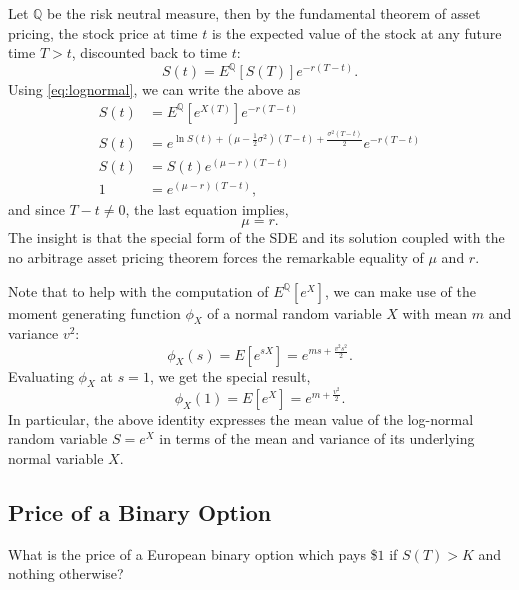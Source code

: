 \documentclass{amsart}
\theoremstyle{plain}
\numberwithin{equation}{section}
\begin{document}
Let $\mathbb{Q}$ be the risk neutral measure, then 
by the fundamental theorem of asset pricing, the stock 
price at time $t$ is the expected value of the stock at any future
time $T>t$, discounted back to time $t$: 
\begin{equation*}
S(t) = E^{\mathbb{Q}}[S(T)]e^{-r(T-t)}.
\end{equation*}
Using \ref{eq:lognormal}, we can write the above as
\begin{align*}
S(t) &= E^{\mathbb{Q}}[e^{X(T)}]e^{-r(T-t)}\\
S(t) &= e^{\ln S(t) + \left(\mu - \frac{1}{2}\sigma^2\right) (T-t) + \frac{\sigma^{2}(T-t)}{2}}
e^{-r(T-t)}\\
S(t) &= S(t) e^{(\mu-r)(T-t)}\\
1 &= e^{(\mu-r)(T-t)},
\end{align*}
and since $T-t \neq 0$, the last equation implies,
\begin{equation*}
\mu = r.
\end{equation*}
The insight is that the special form of the SDE and its solution coupled 
with the no arbitrage asset pricing theorem forces the remarkable
equality of $\mu$ and $r$. 

Note that to help with the computation of $E^{\mathbb{Q}}[e^{X}]$, 
we can make use of the moment generating function $\phi_X$ of a
normal random variable $X$ with mean $m$ and 
variance $v^2$:
\begin{equation*}
\phi_{X}(s) = E[e^{sX}] = e^{ms+\frac{v^2s^2}{2}}.
\end{equation*} 
Evaluating $\phi_X$ at $s=1$, we get the special result,
\begin{equation*}
\phi_{X}(1) = E[e^{X}] = e^{m+\frac{v^2}{2}}.
\end{equation*}
In particular, the above identity expresses the 
mean value of the log-normal random variable $S=e^{X}$ 
in terms of the mean and variance of its underlying normal 
variable $X$. 

\subsection*{Price of a Binary Option}
What is the price of a European binary option 
which pays \$$1$ if $S(T) > K$ and
nothing otherwise?
\end{document}
